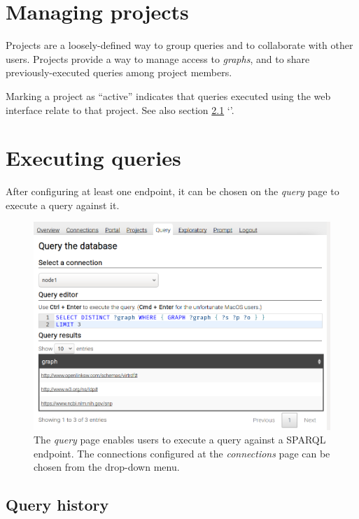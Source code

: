 \section{Managing projects}
\label{sec:web-projects}

  Projects are a loosely-defined way to group queries and to collaborate with
  other users.  Projects provide a way to manage access to \emph{graphs}, and
  to share previously-executed queries among project members.

  Marking a project as ``active'' indicates that queries executed using the web
  interface relate to that project.  See also section \ref{sec:query-history}
  {\color{LinkGray}`'}.

\section{Executing queries}

  After configuring at least one endpoint, it can be chosen on the \emph{query}
  page to execute a query against it.

  \begin{figure}[H]
    \begin{center}
      \includegraphics[width=1.0\textwidth]{figures/web-query.png}
    \end{center}
    \caption{The \emph{query} page enables users to execute a query against a
      SPARQL endpoint.  The connections configured at the \emph{connections} page
      can be chosen from the drop-down menu.}
    \label{fig:web-query}
  \end{figure}

\subsection{Query history}
\label{sec:query-history}

